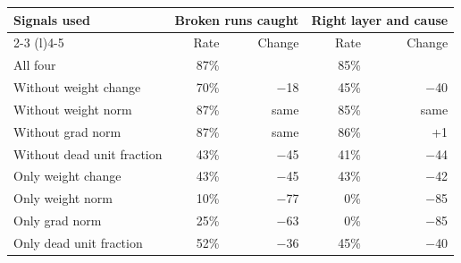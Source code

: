 \begin{tabular}{@{}lrrrr@{}}
\toprule
Signals used & \multicolumn{2}{c}{Broken runs caught} & \multicolumn{2}{c}{Right layer and cause} \\
\cmidrule(lr){2-3} \cmidrule(l){4-5}
 & Rate & Change & Rate & Change \\
\midrule
All four & 87\% & & 85\% & \\
\midrule
Without weight change & 70\% & $-$18 & 45\% & $-$40 \\
Without weight norm & 87\% & same & 85\% & same \\
Without grad norm & 87\% & same & 86\% & +1 \\
Without dead unit fraction & 43\% & $-$45 & 41\% & $-$44 \\
\midrule
Only weight change & 43\% & $-$45 & 43\% & $-$42 \\
Only weight norm & 10\% & $-$77 & 0\% & $-$85 \\
Only grad norm & 25\% & $-$63 & 0\% & $-$85 \\
Only dead unit fraction & 52\% & $-$36 & 45\% & $-$40 \\
\bottomrule
\end{tabular}
